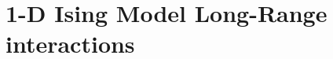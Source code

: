 \documentclass[../../PS3.tex]{subfiles}
\begin{document}
\section{1-D Ising Model Long-Range interactions}
\end{document}
